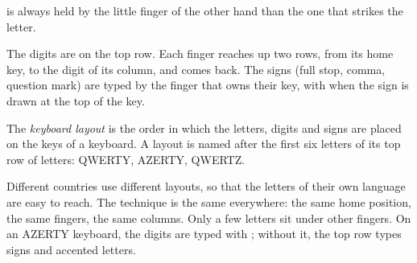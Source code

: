 \begin{omfigure}

{\small {} is always held by the little finger of the other hand than
the one that strikes the letter.}
\label{fig:g3:typing-with-ten-fingers:shift}
\end{omfigure}

The digits are on the top row. Each finger reaches up two rows, from its home
key, to the digit of its column, and comes back. The signs (full stop, comma,
question mark) are typed by the finger that owns their key, with 
when the sign is drawn at the top of the key.

\begin{definition}\label{def:g3:typing-with-ten-fingers:layout}
The \emph{keyboard layout} is the order in which the
letters, digits and signs are placed on the keys of a keyboard. A layout is
named after the first six letters of its top row of letters: QWERTY, AZERTY,
QWERTZ.
\end{definition}

Different countries use different layouts, so that the letters of their own
language are easy to reach. The technique is the same everywhere: the same
home position, the same fingers, the same columns. Only a few letters sit
under other fingers. On an AZERTY keyboard, the digits are typed with
; without it, the top row types signs and accented letters.

